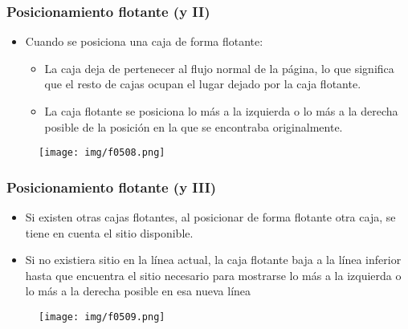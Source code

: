 \begin{frame}
\frametitle{Posicionamiento flotante (y II)}

\begin{itemize}
  \item Cuando se posiciona una caja de forma flotante:
  \begin{itemize}
    \item La caja deja de pertenecer al flujo normal de la página, lo que significa que el resto de cajas ocupan el lugar dejado por la caja flotante.
    \item La caja flotante se posiciona lo más a la izquierda o lo más a la derecha posible de la posición en la que se encontraba originalmente.
  \end{itemize}
\end{itemize}


\begin{center}
\begin{figure}[p]
\texttt{[image: img/f0508.png]}
\end{figure}
\end{center}

\end{frame}



\begin{frame}
\frametitle{Posicionamiento flotante (y III)}

\begin{itemize}
  \item Si existen otras cajas flotantes, al posicionar de forma flotante otra caja, se tiene en cuenta el sitio disponible.
  \item Si no existiera sitio en la línea actual, la caja flotante baja a la línea inferior hasta que encuentra el sitio necesario para mostrarse lo más a la izquierda o lo más a la derecha posible en esa nueva línea
\end{itemize}


\begin{center}
\begin{figure}[p]
\texttt{[image: img/f0509.png]}
\end{figure}
\end{center}

\end{frame}



